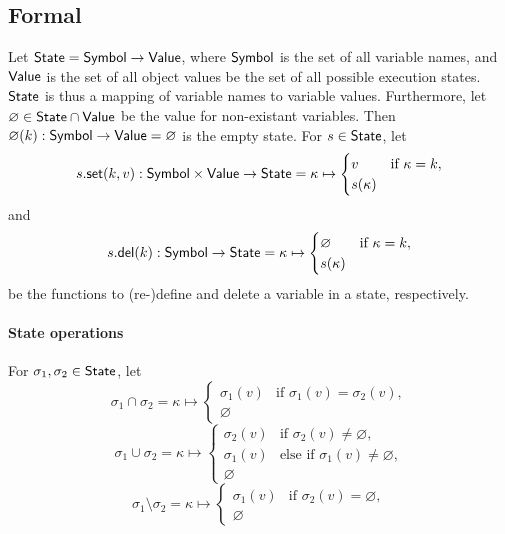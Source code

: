 \subsection{Formal}

Let $\mathsf{State} = \mathsf{Symbol} \to \mathsf{Value}$, where $\mathsf{Symbol}$ is the set of all variable names, and $\mathsf{Value}$ is the set of all object values be the set of all possible execution states.
$\mathsf{State}$ is thus a mapping of variable names to variable values.
Furthermore, let $\varnothing \in \mathsf{State} \cap \mathsf{Value}$ be the value for non-existant variables.
Then $\varnothing(k): \mathsf{Symbol} \to \mathsf{Value} = \varnothing$ is the empty state.
For $s \in \mathsf{State}$, let
$$
s.\mathsf{set}(k, v): \mathsf{Symbol} \times \mathsf{Value} \to \mathsf{State} =
	\kappa \mapsto \begin{cases}
		v & \text{if } \kappa = k,\\
		s(\kappa)
\end{cases}$$
and
$$
s.\mathsf{del}(k): \mathsf{Symbol} \to \mathsf{State} = \kappa \mapsto \begin{cases}
	\varnothing & \text{if } \kappa = k,\\
	s(\kappa)
\end{cases}
$$
be the functions to (re-)define and delete a variable in a state, respectively.

\paragraph{State operations}
For $\sigma_1, \sigma_2 \in \mathsf{State}$, let
$$
	\sigma_1 \cap \sigma_2 =
		\kappa \mapsto \begin{cases}
			\sigma_1(v) &\text{if } \sigma_1(v) = \sigma_2(v),\\
			\varnothing
		\end{cases}
$$
$$
	\sigma_1 \cup \sigma_2 =
		\kappa \mapsto \begin{cases}
			\sigma_2(v) &\text{if } \sigma_2(v) \neq \varnothing,\\
			\sigma_1(v) &\text{else if } \sigma_1(v) \neq \varnothing,\\
			\varnothing
		\end{cases}
$$
$$
	\sigma_1 \setminus \sigma_2 =
		\kappa \mapsto \begin{cases}
			\sigma_1(v) &\text{if } \sigma_2(v) = \varnothing,\\
			\varnothing
		\end{cases}
$$

